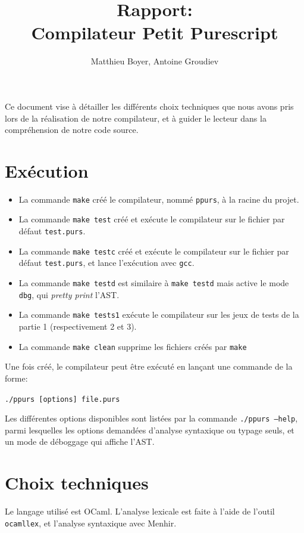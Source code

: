 \documentclass[12pt,a4paper]{article}
\title{\vspace{-3ex}\textbf{Rapport:\\ Compilateur Petit Purescript}}
\author{Matthieu Boyer, Antoine Groudiev}
\date{}
\begin{document}
\maketitle

Ce document vise à détailler les différents choix techniques que nous avons pris lors de la réalisation de notre compilateur, et à guider le lecteur dans la compréhension de notre code source.

\section{Exécution}
\begin{itemize}
    \item La commande \texttt{make} créé le compilateur, nommé \texttt{ppurs}, à la racine du projet.
    \item La commande \texttt{make test} créé et exécute le compilateur sur le fichier par défaut \texttt{test.purs}.
    \item La commande \texttt{make testc} créé et exécute le compilateur sur le fichier par défaut \texttt{test.purs}, et lance l'exécution avec \texttt{gcc}.
    \item La commande \texttt{make testd} est similaire à \texttt{make testd} mais active le mode \texttt{dbg}, qui \emph{pretty print} l'AST.
    \item La commande \texttt{make tests1} exécute le compilateur sur les jeux de tests de la partie 1 (respectivement 2 et 3).
    \item La commande \texttt{make clean} supprime les fichiers créés par \texttt{make}
\end{itemize}

Une fois créé, le compilateur peut être exécuté en lançant une commande de la forme:
\begin{center}
    \texttt{./ppurs [options] file.purs}
\end{center}
Les différentes options disponibles sont listées par la commande \texttt{./ppurs --help}, parmi lesquelles les options demandées d'analyse syntaxique ou typage seuls, et un mode de déboggage qui affiche l'AST.

\section{Choix techniques}
Le langage utilisé est OCaml. L'analyse lexicale est faite à l'aide de l'outil \texttt{ocamllex}, et l'analyse syntaxique avec Menhir.
\end{document}
